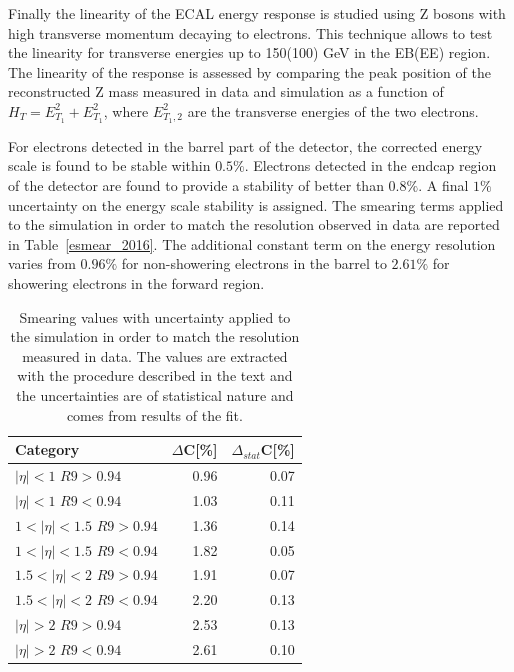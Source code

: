 Finally the linearity of the ECAL energy response is studied using Z bosons with high transverse momentum
decaying to electrons. This technique allows to test the linearity for transverse energies up to 150(100) GeV in
the EB(EE) region.
The linearity of the response is assessed by comparing the peak position of the
reconstructed Z mass measured in data and simulation as a function of $H_T = E_{T_1}^2 + E_{T_1}^2$, where
$E_{T_1,2}^2$ are the transverse energies of the two electrons.

For electrons detected in the barrel part of the detector, the corrected energy scale
is found to be stable within $0.5\%$. Electrons detected in the endcap region of the
detector are found to provide a stability of better than $0.8\%$.
A final $1\%$ uncertainty on the energy scale stability is assigned.
The smearing terms applied to the simulation in order to match the resolution observed in data are reported in
Table~\ref{esmear_2016}. The additional constant term on the energy resolution varies from $0.96\%$ for
non-showering electrons in the barrel to $2.61\%$ for showering electrons in the forward region.

\begin{table}[!h]
 \begin{center}
   \begin{tabular}{|l|r|r|}
     \hline
     Category                   & $\Delta$C[\%] & $\Delta_{stat}$C[\%] \\ \hline
 $|\eta| < 1$ $R9 > 0.94$       & 0.96          & 0.07 \\
 $|\eta| < 1$ $R9 < 0.94$       & 1.03          & 0.11 \\
 $1 < |\eta| < 1.5$ $R9 > 0.94$ & 1.36          & 0.14 \\
 $1 < |\eta| < 1.5$ $R9 < 0.94$ & 1.82          & 0.05 \\
 $1.5 < |\eta| < 2$ $R9 > 0.94$ & 1.91          & 0.07 \\
 $1.5 < |\eta| < 2$ $R9 < 0.94$ & 2.20          & 0.13 \\
 $|\eta| > 2$ $R9 > 0.94$       & 2.53          & 0.13 \\
 $|\eta| > 2$ $R9 < 0.94$       & 2.61          & 0.10 \\
   \hline
   \end{tabular}
   \caption{Smearing values with uncertainty applied to the simulation in order to match the resolution measured in data.
     The values are extracted with the procedure described in the text and the uncertainties are of statistical nature
     and comes from results of the fit.}
    \label{tab:esmear_2016}
  \end{center}
\end{table}

